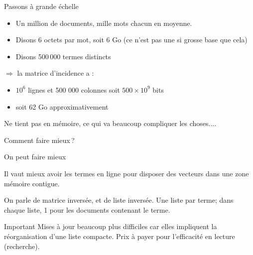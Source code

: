 \begin{frame}{Passons à grande échelle}

\begin{itemize}
 \item Un million de documents, mille mots chacun en moyenne.
 \item Disons 6 octets par mot, soit 6 Go (ce n'est pas une si grosse base que
   cela)
 \item Disons 500\,000 termes \alert{distincts}
\end{itemize}

% 
\smallskip

$\Rightarrow$ la matrice d'incidence a :
\begin{itemize}
  \item $10^6$ lignes et 500 000 colonnes soit $500 \times 10^9$ bits
  \item soit 62 Go approximativement
\end{itemize}

\vfill

Ne tient pas en mémoire, ce qui va beaucoup compliquer les choses....

\vfill

\alert{Comment faire mieux\,?}

\end{frame}

\begin{frame}{On peut faire mieux}

  \begin{minipage}[c]{.46\linewidth}
       Il vaut mieux avoir les termes en ligne pour disposer des vecteurs dans une zone
mémoire contigue.

\vspace*{1cm}

On parle de matrice inversée, et de \alert{liste inversée}.
Une liste par terme; dans chaque liste, 1 pour les documents contenant le terme.
   \end{minipage} \hfill
   \begin{minipage}[c]{.46\linewidth}
   \end{minipage}
   
\begin{blocgauche}
\begin{defblock}{Important}
Mises à jour beaucoup plus difficiles car elles impliquent la réorganisation
d'une liste compacte. Prix à payer pour l'efficacité en \alert{lecture} (recherche).
\end{defblock}
\end{blocgauche}
\end{frame}


